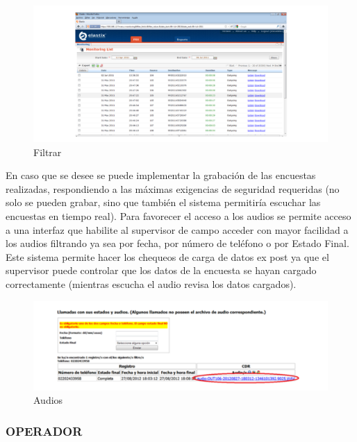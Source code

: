\documentclass[
  openany]{book}
\begin{document}
\begin{figure}

{\centering \includegraphics[width=1\linewidth]{imagenes/figura6-12} 

}

\caption{Filtrar}\label{fig:Fil}
\end{figure}

En caso que se desee se puede implementar la grabación de las encuestas realizadas, respondiendo a las máximas exigencias de seguridad requeridas (no solo se pueden grabar, sino que también el sistema permitiría escuchar las encuestas en tiempo real). Para favorecer el acceso a los audios se permite acceso a una interfaz que habilite al supervisor de campo acceder con mayor facilidad a los audios filtrando ya sea por fecha, por número de teléfono o por Estado Final. Este sistema permite hacer los chequeos de carga de datos ex post ya que el supervisor puede controlar que los datos de la encuesta se hayan cargado correctamente (mientras escucha el audio revisa los datos cargados).

\begin{figure}

{\centering \includegraphics[width=1\linewidth]{imagenes/figura6-13} 

}

\caption{Audios}\label{fig:Aud}
\end{figure}

\hypertarget{operador}{%
\subsubsection{\texorpdfstring{\textbf{OPERADOR}}{OPERADOR}}\label{operador}}
\end{document}
